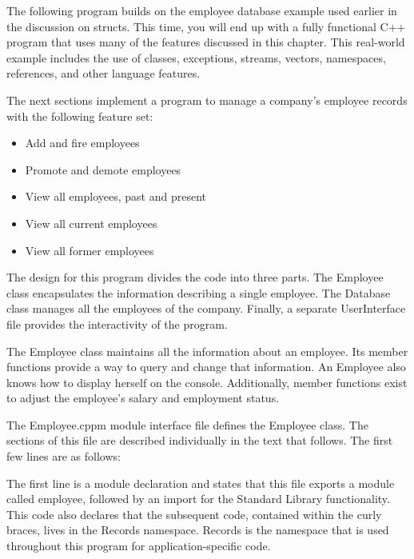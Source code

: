 
The following program builds on the employee database example used earlier in the discussion on structs. This time, you will end up with a fully functional C++ program that uses many of the features discussed in this chapter. This real-world example includes the use of classes, exceptions, streams, vectors, namespaces, references, and other language features.


The next sections implement a program to manage a company’s employee records with the following feature set:

\begin{itemize}
\item
Add and fire employees

\item
Promote and demote employees

\item
View all employees, past and present

\item
View all current employees

\item
View all former employees
\end{itemize}

The design for this program divides the code into three parts. The Employee class encapsulates the information describing a single employee. The Database class manages all the employees of the company. Finally, a separate UserInterface file provides the interactivity of the program.


The Employee class maintains all the information about an employee. Its member functions provide a way to query and change that information. An Employee also knows how to display herself on the console. Additionally, member functions exist to adjust the employee’s salary and employment status.


The Employee.cppm module interface file defines the Employee class. The sections of this file are described individually in the text that follows. The first few lines are as follows:

\begin{cpp}
export module employee;
import std;
namespace Records {
\end{cpp}

The first line is a module declaration and states that this file exports a module called employee, followed by an import for the Standard Library functionality. This code also declares that the subsequent code, contained within the curly braces, lives in the Records namespace. Records is the namespace that is used throughout this program for application-specific code.

